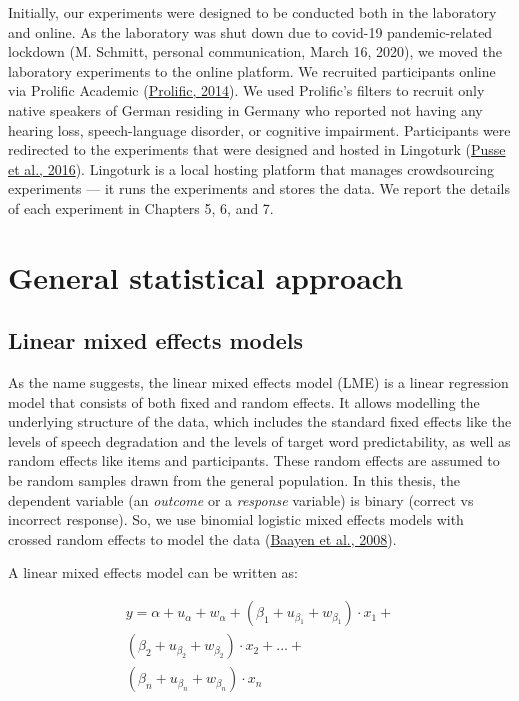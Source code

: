 \documentclass[a4paper, nobind]{templates/ociamthesis}
\renewcommand{\chaptermark}[1]{\markboth{\thechapter. #1}{\thechapter. #1}}
\begin{document}
Initially, our experiments were designed to be conducted both in the laboratory and online.
As the laboratory was shut down due to covid-19 pandemic-related lockdown (M. Schmitt, personal communication, March 16, 2020), we moved the laboratory experiments to the online platform.
We recruited participants online via Prolific Academic (\protect\hyperlink{ref-Prolific}{Prolific, 2014}).
We used Prolific's filters to recruit only native speakers of German residing in Germany
who reported not having any hearing loss, speech-language disorder, or cognitive impairment.
Participants were redirected to the experiments that were designed and hosted in Lingoturk (\protect\hyperlink{ref-Pusse2016}{Pusse et al., 2016}).
Lingoturk is a local hosting platform that manages crowdsourcing experiments --- it runs the experiments and stores the data.
We report the details of each experiment in Chapters 5, 6, and 7.

\hypertarget{chapter-stats}{%
\chapter{General statistical approach}\label{chapter-stats}}

\chaptermark{Statistics}

\hypertarget{linear-mixed-effects-models}{%
\section{Linear mixed effects models}\label{linear-mixed-effects-models}}

As the name suggests, the linear mixed effects model (LME) is a linear regression model that consists of both fixed and random effects.
It allows modelling the underlying structure of the data, which includes
the standard fixed effects like the levels of speech degradation and the levels of target word predictability,
as well as random effects like items and participants.
These random effects are assumed to be random samples drawn from the general population.
In this thesis, the dependent variable (an \emph{outcome} or a \emph{response} variable) is binary (correct vs incorrect response).
So, we use binomial logistic mixed effects models with crossed random effects to model the data (\protect\hyperlink{ref-Baayen2008}{Baayen et al., 2008}).

A linear mixed effects model can be written as:

\begin{align} \label{eq:mixed-effects1}
y = \alpha + u_{\alpha} + w_{\alpha} +
    (\beta_{1} + u_{\beta_{1}} + w_{\beta_{1}})\cdot {x_1} + \nonumber\\
    (\beta_{2} + u_{\beta_{2}} + w_{\beta_{2}})\cdot {x_2} + ... + \nonumber\\
    (\beta_{n} + u_{\beta_{n}} + w_{\beta_{n}})\cdot {x_n} 
\end{align}
\end{document}
